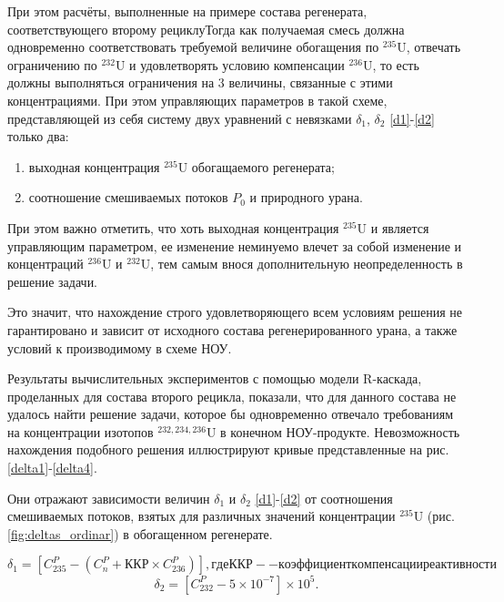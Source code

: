 При этом расчёты, выполненные на примере состава регенерата, соответствующего второму рециклуТогда как получаемая смесь должна одновременно соответствовать требуемой величине обогащения по $^{235}$U, отвечать ограничению по $^{232}$U и удовлетворять условию компенсации $^{236}$U, то есть должны выполняться ограничения на 3 величины, связанные с этими концентрациями. При этом управляющих параметров в такой схеме, представляющей из себя систему двух уравнений с невязками $\delta_1$, $\delta_2$ \ref{d1}-\ref{d2} только два:

\begin{enumerate}
  \item выходная концентрация $^{235}$U обогащаемого регенерата;
  \item соотношение смешиваемых потоков $P_0$ и природного урана.
\end{enumerate}

При этом важно отметить, что хоть выходная концентрация $^{235}$U и является управляющим параметром, ее изменение неминуемо влечет за собой изменение и концентраций $^{236}$U и $^{232}$U, тем самым внося дополнительную неопределенность в решение задачи.

Это значит, что нахождение строго удовлетворяющего всем условиям решения не гарантировано и зависит от исходного состава регенерированного урана, а также условий к производимому в схеме НОУ.

Результаты вычислительных экспериментов с помощью модели R-каскада, проделанных для состава второго рецикла, показали, что для данного состава не удалось найти решение задачи, которое бы одновременно отвечало требованиям на концентрации изотопов $^{232,234,236}$U в конечном НОУ-продукте. Невозможность нахождения подобного решения иллюстрируют кривые представленные на рис. \ref{delta1}-\ref{delta4}.

Они отражают зависимости величин $\delta_1$ и $\delta_2$ \ref{d1}-\ref{d2} от соотношения смешиваемых потоков, взятых для различных значений концентрации $^{235}$U (рис. \ref{fig:deltas_ordinar}) в обогащенном регенерате.

\begin{equation} \label{d1} 
  \delta_1=\left[C_{235}^P-\left(C_n^P+ККР\times C_{236}^P\right)\right], где ККР -- коэффициент компенсации реактивности
  \end{equation} 
  \begin{equation} \label{d2} 
    \delta_2=\left[C_{232}^P-5\times10^{-7}\right]\times10^5.             
\end{equation}

